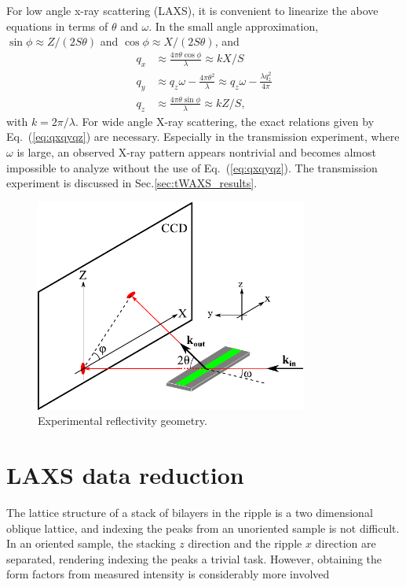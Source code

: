 For low angle x-ray scattering (LAXS), it is convenient to linearize the above
equations in terms of $\theta$ and $\omega$. In the small angle approximation, 
$\sin\phi \approx Z/(2S\theta)$ and $\cos\phi \approx X/(2S\theta)$, and
\begin{align}
  q_x &\approx \frac{4\pi\theta\cos\phi}{\lambda} \approx kX/S \nonumber\\
  q_y &\approx q_z\omega -\frac{4\pi\theta^2}{\lambda} \approx q_z\omega - \frac{\lambda q_z^2}{4\pi}\nonumber\\
  q_z &\approx \frac{4\pi\theta\sin\phi}{\lambda} \approx kZ/S,
  \label{eq:qxqyqz_small}
\end{align}
with $k=2\pi/\lambda$. For wide angle X-ray scattering, the exact relations given
by Eq.~(\ref{eq:qxqyqz}) are necessary. Especially in the transmission experiment,
where $\omega$ is large, an observed X-ray pattern appears nontrivial and becomes
almost impossible to analyze without the use of Eq.~(\ref{eq:qxqyqz}).
The transmission experiment is discussed in Sec.\ref{sec:tWAXS_results}.

\begin{figure}[htbp]
  \centering
  \includegraphics[width=0.8\textwidth]{figures/ripple/analysis/laxs_setup}
  \caption{Experimental reflectivity geometry.}
  \label{fig:laxs_setup}
\end{figure}

\newpage
\section{LAXS data reduction}\label{sec:LAXS_data_reduction}
The lattice structure of a stack of bilayers in the ripple is a two dimensional
oblique lattice, and indexing the peaks from an unoriented sample is not 
difficult. In an oriented sample, the stacking $z$ direction and the ripple
$x$ direction are separated, rendering indexing the peaks a trivial task.
However, obtaining the form factors from measured intensity is considerably
more involved


